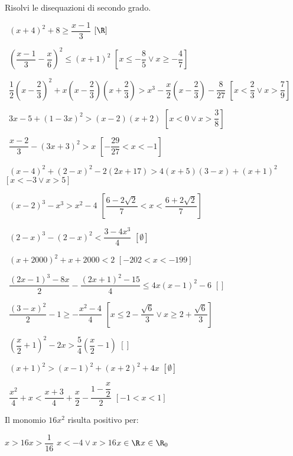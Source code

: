 \begin{esercizio}[\Ast]
\label{ese:4.20}
Risolvi le disequazioni di secondo grado.
\vspace{\dy}
 \begin{enumeratea}
 \item~\((x+4)^2+8\ge \dfrac{x-1} 3\)
  \hfill \(\left[\R\right]\)
 \item~\(\left(\dfrac{x-1} 3-\dfrac x 6\right)^2\le (x+1)^2\)
  \hfill \(\left[x\le -\dfrac 8 5\vee x\ge -\dfrac 4 7\right]\)
 \item~\(\dfrac 1 2\left(x-\dfrac 2 3\right)^2+x\left(x-\dfrac 2 3\right)
  \left(x+\dfrac 2 3\right)>x^3-\dfrac x 2\left(x-\dfrac 2 3\right)-\dfrac 
8{27}\)
  \hfill \(\left[x<\dfrac 2 3\vee x>\dfrac 7 9\right]\)
 \item~\(3x-5+(1-3x)^2>(x-2)(x+2)\)
  \hfill \(\left[x<0\vee x>\dfrac 3 8\right]\)
 \item~\(\dfrac{x-2} 3-(3x+3)^2>x\)
  \hfill \(\left[-\dfrac{29}{27}<x<-1\right]\)
 \item~\((x-4)^2+(2-x)^2-2(2x+17)>4(x+5)(3-x)+(x+1)^2\)
  \hfill \(\left[x<-3\vee x>5\right]\)
 \item~\((x-2)^3-x^3>x^2-4\)
  \hfill \(\left[\dfrac{6-2\sqrt 2} 7<x<\dfrac{6+2\sqrt 2} 7\right]\)
 \item~\((2-x)^3-(2-x)^2<\dfrac{3-4x^3} 4\)
  \hfill \(\left[\emptyset\right]\)
 \item~\((x+2000)^2+x+2000<2\)
  \hfill \(\left[-202<x<-199\right]\)
 \item~\(\dfrac{\left(2x-1\right)^3-8x} 2-\dfrac{\left(2x+1\right)^2-15} 4\le 
 4x\left(x-1\right)^2-6\)
  \hfill \(\left[\right]\)
 \item~\(\dfrac{(3-x)^2} 2-1\ge -\dfrac{x^2-4} 4\) 
  \hfill \(\left[x\le 2-\dfrac{\sqrt 6} 3\vee x\ge 2+\dfrac{\sqrt 6} 
3\right]\)
 \item~\(\left(\dfrac x 2+1\right)^2-2x>\dfrac 5 4\left(\dfrac x 2-1\right)\)
  \hfill \(\left[\right]\)
 \item~\((x+1)^2>(x-1)^2+(x+2)^2+4x\)
  \hfill \(\left[\emptyset \right]\)
 \item~\(\dfrac{x^2} 4+x<\dfrac{x+3} 4+\dfrac x 2-\dfrac{1-\dfrac x 2} 2\)
  \hfill \(\left[-1<x<1\right]\)
 \end{enumeratea}
\end{esercizio}

\begin{esercizio}
\label{ese:4.23}
Il monomio \(16x^2\) risulta positivo per:

\boxA\quad \(x>16\)\qquad \boxB\quad \(x>\dfrac 1{16}\)\qquad\boxC\quad 
\(x<-4\vee 
x>16\)\qquad\boxD\quad \(x\in \R\)\qquad\boxE\quad \(x\in \R_0\)

\end{esercizio}

